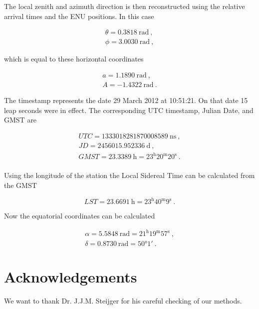The local zenith and azimuth direction is then reconstructed using the
relative arrival times and the ENU positions. In this case

\begin{equation}
    \begin{array}{l}
        \theta = \SI{0.3818}{\radian} \ , \\
        \phi = \SI{3.0030}{\radian} \ ,
    \end{array}
\end{equation}

\noindent which is equal to these horizontal coordinates

\begin{equation}
    \begin{array}{l}
        a = \SI{1.1890}{\radian} \ , \\
        A = \SI{-1.4322}{\radian} \ .
    \end{array}
\end{equation}

The \gps timestamp represents the date 29 March 2012 at 10:51:21. On
that date 15 leap seconds were in effect. The corresponding UTC
timestamp, Julian Date, and GMST are

\begin{equation}
    \begin{array}{l}
        \mathit{UTC} = \SI{1333018281870008589}{\nano\second} \ , \\
        \mathit{JD} = \SI{2456015.952336}{\day} \ , \\
        \mathit{GMST} = \SI{23.3389}{\hour} = 23^\mathrm{h}20^\mathrm{m}20^\mathrm{s} \ . \\
    \end{array}
\end{equation}

Using the longitude of the station the Local Sidereal Time can be
calculated from the GMST

\begin{equation}
    \mathit{LST} = \SI{23.6691}{\hour} = 23^\mathrm{h}40^\mathrm{m}9^\mathrm{s} \ .
\end{equation}

Now the equatorial coordinates can be calculated

\begin{equation}
    \begin{array}{l}
        \alpha = \SI{5.5848}{\radian} = 21^\mathrm{h}19^\mathrm{m}57^\mathrm{s} \ , \\
        \delta = \SI{0.8730}{\radian} = \ang{50;1;} \ .
    \end{array}
\end{equation}


\section{Acknowledgements}

We want to thank Dr. J.J.M. Steijger for his careful checking of our
methods.
